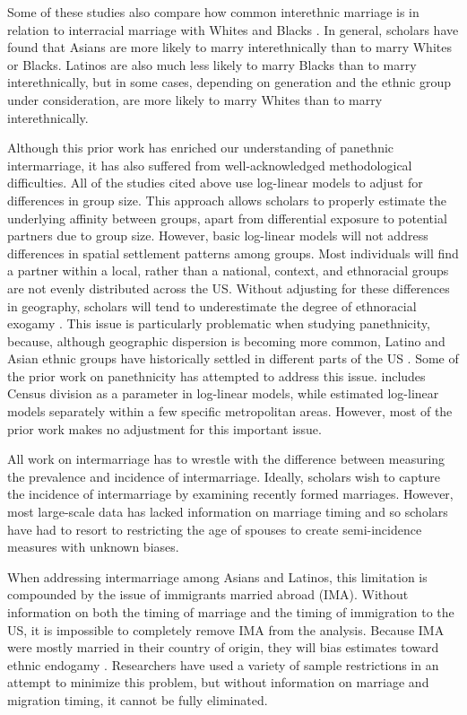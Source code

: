 \documentclass[11pt,]{article}
\begin{document}
Some of these studies also compare how common interethnic marriage is in relation to interracial marriage with Whites and Blacks \citep{qian_asian_2001, fu_how_2007a, qian_crossing_2012}. In general, scholars have found that Asians are more likely to marry interethnically than to marry Whites or Blacks. Latinos are also much less likely to marry Blacks than to marry interethnically, but in some cases, depending on generation and the ethnic group under consideration, are more likely to marry Whites than to marry interethnically.

Although this prior work has enriched our understanding of panethnic intermarriage, it has also suffered from well-acknowledged methodological difficulties. All of the studies cited above use log-linear models to adjust for differences in group size. This approach allows scholars to properly estimate the underlying affinity between groups, apart from differential exposure to potential partners due to group size. However, basic log-linear models will not address differences in spatial settlement patterns among groups. Most individuals will find a partner within a local, rather than a national, context, and ethnoracial groups are not evenly distributed across the US. Without adjusting for these differences in geography, scholars will tend to underestimate the degree of ethnoracial exogamy \citep{harris_how_2005}. This issue is particularly problematic when studying panethnicity, because, although geographic dispersion is becoming more common, Latino and Asian ethnic groups have historically settled in different parts of the US \citep{massey_geographic_2008}. Some of the prior work on panethnicity has attempted to address this issue. \citet{fu_how_2007a} includes Census division as a parameter in log-linear models, while \citet{rosenfeld_salience_2001} estimated log-linear models separately within a few specific metropolitan areas. However, most of the prior work makes no adjustment for this important issue.

All work on intermarriage has to wrestle with the difference between measuring the prevalence and incidence of intermarriage. Ideally, scholars wish to capture the incidence of intermarriage by examining recently formed marriages. However, most large-scale data has lacked information on marriage timing and so scholars have had to resort to restricting the age of spouses to create semi-incidence measures with unknown biases.

When addressing intermarriage among Asians and Latinos, this limitation is compounded by the issue of immigrants married abroad (IMA). Without information on both the timing of marriage and the timing of immigration to the US, it is impossible to completely remove IMA from the analysis. Because IMA were mostly married in their country of origin, they will bias estimates toward ethnic endogamy \citep{hwang_problem_1990}. Researchers have used a variety of sample restrictions in an attempt to minimize this problem, but without information on marriage and migration timing, it cannot be fully eliminated.
\end{document}
